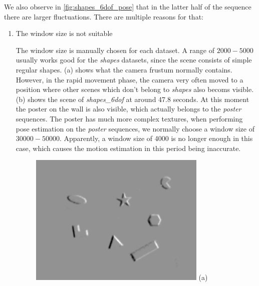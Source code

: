 We also observe in \cref{fig:shapes_6dof_pose} that in the latter half
of the sequence there are larger fluctuations. There are multiple
reasons for that:
\begin{enumerate}
\item The window size is not suitable

  The window size is manually chosen for each dataset. A range of
  $2000 - 5000$ usually works good for the \textit{shapes} datasets,
  since the scene consists of simple regular
  shapes. (a) shows what the camera frustum
  normally contains. However, in the rapid movement phase, the camera
  very often moved to a position where other scenes which don't belong
  to \textit{shapes} also becoms visible. (b)
  shows the scene of \textit{shapes\_6dof} at around 47.8 seconds. At
  this moment the poster on the wall is also visible, which actually
  belongs to the \textit{poster} sequences. The poster has much more
  complex textures, when performing pose estimation on the
  \textit{poster} sequences, we normally choose a window size of
  $30000-50000$. Apparently, a window size of 4000 is no longer enough
  in this case, which causes the motion estimation in this period
  being inaccurate.
  \begin{figure}
    \begin{minipage}[t]{0.48\textwidth}
      \centering \includegraphics[width =
      \textwidth]{images/window_size_good.jpg} (a)
    \end{minipage}
    \hfill
    \begin{minipage}[t]{0.48\textwidth}

\end{minipage}
\end{figure}
\end{enumerate}
